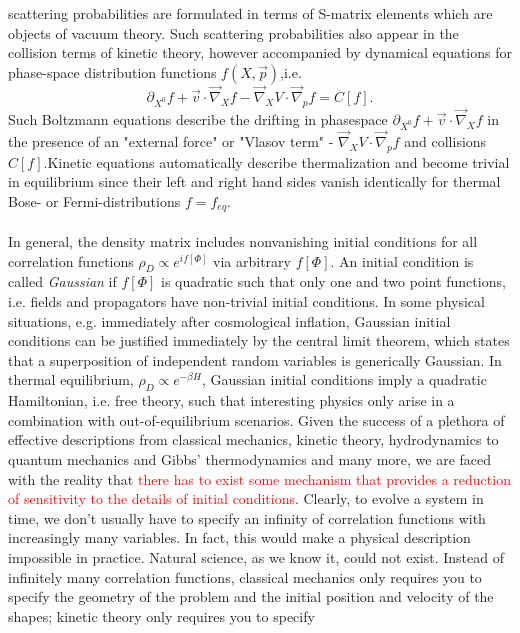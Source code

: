 scattering probabilities are formulated in terms of S-matrix elements which are objects of vacuum theory.
Such scattering probabilities also appear in the collision terms of kinetic theory, however accompanied by
dynamical equations for phase-space distribution functions $f(X,\vec{p})$,i.e.
\begin{equation}
	\partial_{X^0} f + \vec{v}\cdot \vec{\nabla}_X f- \vec{\nabla}_XV \cdot \vec{\nabla}_p f = C[f].
\end{equation}
Such Boltzmann equations describe the drifting in phasespace $\partial_{X^0} f +\vec{v}\cdot \vec{\nabla}_Xf$ in the presence of an "external force" or "Vlasov term" - $\vec{\nabla}_X V\cdot \vec{\nabla}_p f$ and collisions $C[f]$.Kinetic equations automatically describe
thermalization and become trivial in equilibrium since their left and right hand sides vanish identically
for thermal Bose- or Fermi-distributions $f=f_{eq}$.\\
\\
In general, the density matrix includes nonvanishing initial conditions for all correlation functions
$\rho_D\propto e^{if[\Phi]}$ via arbitrary $f[\Phi]$. An initial condition is called \emph{Gaussian} if $f[\Phi]$ is quadratic such that
only one and two point functions, i.e. fields and propagators have non-trivial initial conditions. In some
physical situations, e.g. immediately after cosmological inflation, Gaussian initial conditions can be
justified immediately by the central limit theorem, which states that a superposition of independent
random variables is generically Gaussian. In thermal equilibrium, $\rho_D \propto e^{-\beta H}$, Gaussian initial conditions
imply a quadratic Hamiltonian, i.e. free theory, such that interesting physics only arise in a combination
with out-of-equilibrium scenarios. Given the success of a plethora of effective descriptions from classical
mechanics, kinetic theory, hydrodynamics to quantum mechanics and Gibbs’ thermodynamics and many
more, we are faced with the reality that \textcolor{red}{there has to exist some mechanism that provides a reduction of
sensitivity to the details of initial conditions}. Clearly, to evolve a system in time, we don’t usually have to
specify an infinity of correlation functions with increasingly many variables. In fact, this would make a
physical description impossible in practice. Natural science, as we know it, could not exist. Instead of
infinitely many correlation functions, classical mechanics only requires you to specify the geometry of the
problem and the initial position and velocity of the shapes; kinetic theory only requires you to specify

